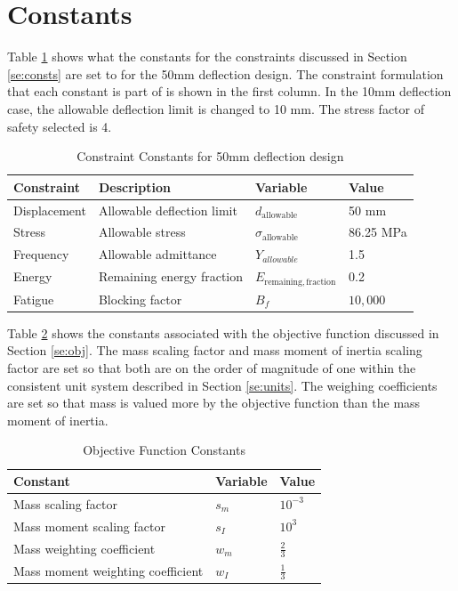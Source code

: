 \documentclass[doublespace,nopageskip]{VTthesis}
\begin{document}
{	
	\section{Constants} \label{se:constas}
	
	Table \ref{tab:constraint_constants} shows what the constants for the constraints discussed in Section \ref{se:consts} are set to for the 50mm deflection design. The constraint formulation that each constant is part of is shown in the first column. In the 10mm deflection case, the allowable deflection limit is changed to 10 mm. The stress factor of safety selected is 4.  
	
	\begin{table}[H]
		\centering
		\caption{Constraint Constants for 50mm deflection design}
		\begin{tabular}{llll}
			\hline
			Constraint & Description & Variable & Value \\
			\hline
			Displacement & Allowable deflection limit & $d_{\text{allowable}}$ & 50 mm \\
			Stress & Allowable stress & $\sigma_{\text{allowable}}$ & 86.25 MPa \\
			Frequency & Allowable admittance & $Y_{allowable}$ & 1.5 \\
			Energy & Remaining energy fraction & $E_{\mathrm{remaining,fraction}}$ & 0.2 \\
			Fatigue & Blocking factor & $B_f$ & $10{,}000$ \\
			\hline
		\end{tabular}
		\label{tab:constraint_constants}
	\end{table}
	
	Table \ref{tab:obj_constants} shows the constants associated with the objective function discussed in Section \ref{se:obj}. The mass scaling factor and mass moment of inertia scaling factor are set so that both are on the order of magnitude of one within the consistent unit system described in Section \ref{se:units}. The weighing coefficients are set so that mass is valued more by the objective function than the mass moment of inertia. 
	
	\begin{table}[H]
		\centering
		\caption{Objective Function Constants} 
		\begin{tabular}{lll}
			\hline
			Constant & Variable & Value \\
			\hline
			Mass scaling factor & $s_m$ & $10^{-3}$ \\
			Mass moment scaling factor & $s_I$ & $10^{3}$ \\
			Mass weighting coefficient & $w_m$ & $\frac{2}{3}$ \\
			Mass moment weighting coefficient & $w_I$ & $\frac{1}{3}$ \\
			\hline
		\end{tabular}
		\label{tab:obj_constants}
	\end{table}
	
}
\end{document}
